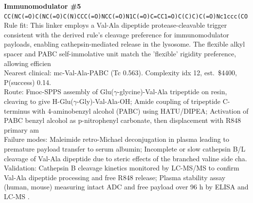 \documentclass[10pt]{article}
\begin{document}
\noindent\textbf{Immunomodulator \#5} \\ \texttt{CC(NC(=O)C(NC(=O)C(N)CCC(=O)NCC(=O)N1C(=O)C=CC1=O)C(C)C)C(=O)Nc1ccc(CO} \\ Rule fit: This linker employs a Val-Ala dipeptide protease-cleavable trigger consistent with the derived rule's cleavage preference for immunomodulator payloads, enabling cathepsin-mediated release in the lysosome. The flexible alkyl spacer and PABC self-immolative unit match the 'flexible' rigidity preference, allowing efficien \\ Nearest clinical: mc-Val-Ala-PABC (Tc 0.563). Complexity idx 12, est.\ \$4400, P(success) 0.14. \\ Route: Fmoc-SPPS assembly of Glu($\gamma$-glycine)-Val-Ala tripeptide on resin, cleaving to give H-Glu($\gamma$-Gly)-Val-Ala-OH; Amide coupling of tripeptide C-terminus with 4-aminobenzyl alcohol (PABC) using HATU/DIPEA; Activation of PABC benzyl alcohol as p-nitrophenyl carbonate, then displacement with R848 primary am \\ Failure modes: Maleimide retro-Michael deconjugation in plasma leading to premature payload transfer to serum albumin; Incomplete or slow cathepsin B/L cleavage of Val-Ala dipeptide due to steric effects of the branched valine side cha. Validation: Cathepsin B cleavage kinetics monitored by LC-MS/MS to confirm Val-Ala dipeptide processing and free R848 release; Plasma stability assay (human, mouse) measuring intact ADC and free payload over 96 h by ELISA and LC-MS . \\[0.4em]
\end{document}
